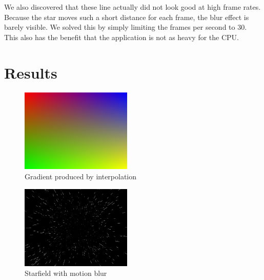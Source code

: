 \documentclass[a4paper]{article}
\begin{document}
We also discovered that these line actually did not look good at high frame rates.
Because the star moves such a short distance for each frame, the blur effect is barely visible.
We solved this by simply limiting the frames per second to 30.
This also has the benefit that the application is not as heavy for the CPU.

\section{Results}

\begin{figure}
\includegraphics[width=150pt]{gradient.png}
\caption{Gradient produced by interpolation}
\end{figure}

\begin{figure}
\includegraphics[width=150pt]{starfield.png}
\caption{Starfield with motion blur}
\end{figure}
\end{document}
